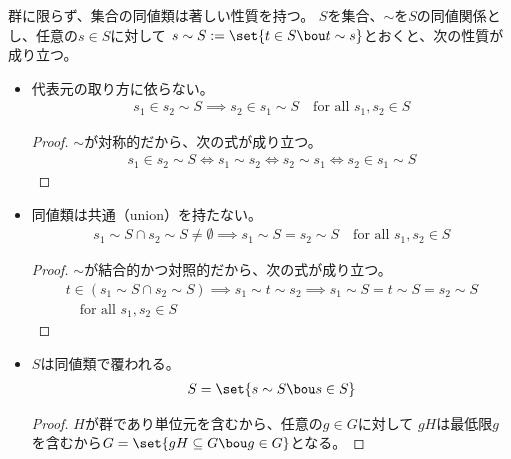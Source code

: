 	群に限らず、集合の同値類は著しい性質を持つ。
	$S$を集合、$\sim$を$S$の同値関係とし、任意の$s\in S$に対して
	$s\sim S := \set{t\in S\bou t\sim s}$とおくと、次の性質が成り立つ。
	\begin{itemize}\setlength{\itemsep}{-1mm} %
		\item 代表元の取り方に依らない。
		\begin{equation*}\begin{split} %
			s_1\in s_2\sim S \implies s_2\in s_1\sim S
			\quad\text{for all }s_1,s_2\in S
		\end{split}\end{equation*} %
		\begin{proof} $\sim$が対称的だから、次の式が成り立つ。
		\begin{equation*}\begin{split}
			s_1\in s_2\sim S \iff s_1\sim s_2 \iff s_2\sim s_1 
			\iff s_2\in s_1\sim S
		\end{split}\end{equation*}
		\end{proof}
		\item 同値類は共通（union）を持たない。
		\begin{equation*}\begin{split} %
			s_1\sim S\cap s_2\sim S\neq \emptyset \implies s_1\sim S = s_2\sim S
			\quad\text{for all }s_1,s_2\in S
		\end{split}\end{equation*} %
		\begin{proof} $\sim$が結合的かつ対照的だから、次の式が成り立つ。
		\begin{equation*}\begin{split}
			t\in (s_1\sim S\cap s_2\sim S)
			\implies s_1\sim t \sim s_2
			\implies s_1\sim S = t \sim S = s_2\sim S \\
			\quad\text{for all }s_1,s_2\in S
		\end{split}\end{equation*}
		\end{proof}
		\item $S$は同値類で覆われる。
		\begin{equation*}\begin{split} %
			S = \set{s\sim S\bou s\in S}
		\end{split}\end{equation*} %
		\begin{proof} $H$が群であり単位元を含むから、任意の$g\in G$に対して
		$gH$は最低限$g$を含むから$G=\set{gH\subseteq G\bou g\in G}$となる。

\end{proof}
\end{itemize}

